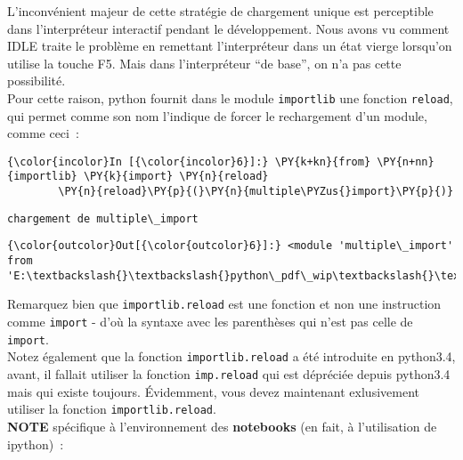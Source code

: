     L'inconvénient majeur de cette stratégie de chargement unique est
perceptible dans l'interpréteur interactif pendant le développement.
Nous avons vu comment IDLE traite le problème en remettant
l'interpréteur dans un état vierge lorsqu'on utilise la touche F5. Mais
dans l'interpréteur ``de base'', on n'a pas cette possibilité.\\

    Pour cette raison, python fournit dans le module \texttt{importlib} une
fonction \texttt{reload}, qui permet comme son nom l'indique de forcer
le rechargement d'un module, comme ceci~:

    \begin{Verbatim}[commandchars=\\\{\}]
{\color{incolor}In [{\color{incolor}6}]:} \PY{k+kn}{from} \PY{n+nn}{importlib} \PY{k}{import} \PY{n}{reload}
        \PY{n}{reload}\PY{p}{(}\PY{n}{multiple\PYZus{}import}\PY{p}{)}
\end{Verbatim}


    \begin{Verbatim}[commandchars=\\\{\}]
chargement de multiple\_import

    \end{Verbatim}

\begin{Verbatim}[commandchars=\\\{\}]
{\color{outcolor}Out[{\color{outcolor}6}]:} <module 'multiple\_import' from 'E:\textbackslash{}\textbackslash{}python\_pdf\_wip\textbackslash{}\textbackslash{}flotpython\textbackslash{}\textbackslash{}w5\textbackslash{}\textbackslash{}multiple\_import.py'>
\end{Verbatim}
            
    Remarquez bien que \texttt{importlib.reload} est une fonction et non une
instruction comme \texttt{import} - d'où la syntaxe avec les parenthèses
qui n'est pas celle de \texttt{import}.\\

Notez également que la fonction \texttt{importlib.reload} a été
introduite en python3.4, avant, il fallait utiliser la fonction
\texttt{imp.reload} qui est dépréciée depuis python3.4 mais qui existe
toujours. Évidemment, vous devez maintenant exlusivement utiliser la
fonction \texttt{importlib.reload}.\\


    \textbf{NOTE} spécifique à l'environnement des \textbf{notebooks} (en
fait, à l'utilisation de ipython)~:\\

